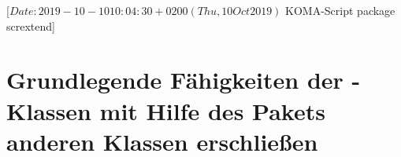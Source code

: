 %
%
%
%
%
%
%
%
% 
%
%
%
%

                 [$Date: 2019-10-10 10:04:30 +0200 (Thu, 10 Oct 2019) $
                  KOMA-Script package scrextend]

\chapter[tocentry={Grundlegende Fähigkeiten der
  \KOMAScript-Klassen\protect\linebreak
  mit Hilfe des Pakets \Package{scrextend} anderen Klassen erschließen},
  head={Fähigkeiten von \KOMAScript-Klassen mit \Package{scrextend}}]
{Grundlegende Fähigkeiten der \KOMAScript-Klassen mit Hilfe des Pakets
   anderen Klassen erschließen}
\BeginIndexGroup
{}%

